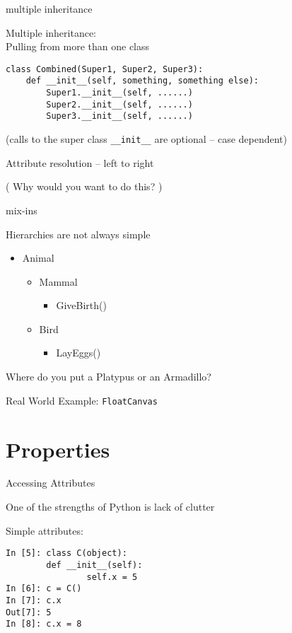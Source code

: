 \documentclass{beamer}
\begin{document}
\begin{frame}[fragile]{multiple inheritance}

{\Large Multiple inheritance:\\
\hspace{0.2in} Pulling from more than one class}

\vfill
\begin{verbatim}
class Combined(Super1, Super2, Super3):
    def __init__(self, something, something else):
        Super1.__init__(self, ......)        
        Super2.__init__(self, ......)        
        Super3.__init__(self, ......)        
\end{verbatim}
(calls to the super class \verb|__init__| are optional -- case dependent)

\vfill
{\Large Attribute resolution -- left to right}

\vfill
( Why would you want to do this? )

\end{frame} 

\begin{frame}[fragile]{mix-ins}

\vfill
{\Large Hierarchies are not always simple}
\vfill
\begin{itemize}
  \item Animal
  \begin{itemize}
    \item Mammal
    \begin{itemize}
      \item GiveBirth()
    \end{itemize}
    \item Bird
    \begin{itemize}
      \item LayEggs()
    \end{itemize}
  \end{itemize}
\end{itemize}
\vfill
{\Large Where do you put a Platypus or an Armadillo?}

\vfill
{\Large Real World Example: \verb|FloatCanvas|}
\end{frame} 
\section{Properties}

\begin{frame}[fragile]{Accessing Attributes}

{\Large One of the strengths of Python is lack of clutter}

\vfill
{\Large Simple attributes:}

\begin{verbatim}
In [5]: class C(object):
        def __init__(self):
                self.x = 5
In [6]: c = C()
In [7]: c.x
Out[7]: 5
In [8]: c.x = 8
\end{verbatim}

\end{frame} 
\end{document}

